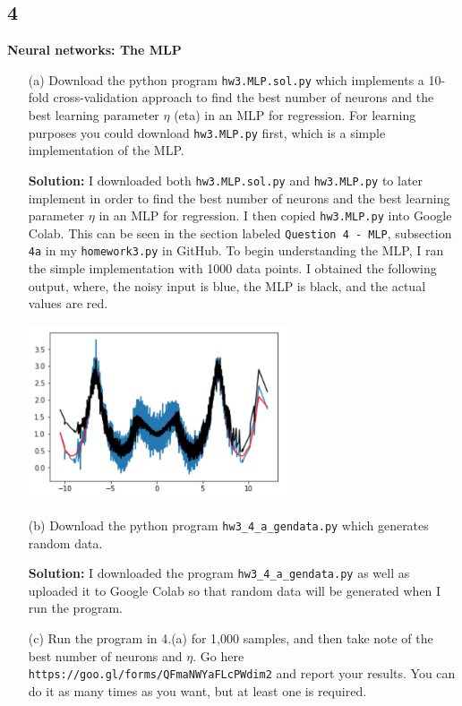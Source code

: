 \documentclass[a4paper]{article}
\begin{document}
\subsection{4} \textbf{Neural networks: The MLP}
\begin{itemize}
    \item[(a)] Download the python program \verb|hw3.MLP.sol.py| which implements a 10-fold 
    cross-validation approach to find the best number of neurons and the best learning parameter 
    $\eta$ (eta) in an MLP for regression. For learning purposes you could download \verb|hw3.MLP.py| 
    first, which is a simple implementation of the MLP.
    
    \textbf{Solution:} I downloaded both \verb|hw3.MLP.sol.py| and \verb|hw3.MLP.py| to later 
    implement in order to find the best number of neurons and the best learning parameter $\eta$ 
    in an MLP for regression.  I then copied \verb|hw3.MLP.py| into Google Colab.  This can be seen 
    in the section labeled \verb|Question 4 - MLP|, subsection \verb|4a| in my \verb|homework3.py| in GitHub.  
    To begin understanding the MLP, I ran the simple implementation with 1000 data points.  I obtained 
    the following output, where, the noisy input is blue, the MLP is black, and the actual values 
    are red.
    \begin{center}
        \includegraphics[width=0.6\textwidth]{4a1000.jpg}
    \end{center}
    
    \item[(b)] Download the python program \verb|hw3_4_a_gendata.py| which generates random data.
    
    \textbf{Solution:} I downloaded the program \verb|hw3_4_a_gendata.py| as well as uploaded 
    it to Google Colab so that random data will be generated when I run the program.
    
    \item[(c)] Run the program in 4.(a) for 1,000 samples, and then take note of the best number 
    of neurons and $\eta$. Go here \verb|https://goo.gl/forms/QFmaNWYaFLcPWdim2| and report your 
    results. You can do it as many times as you want, but at least one is required.
    

\end{itemize}
\end{document}
